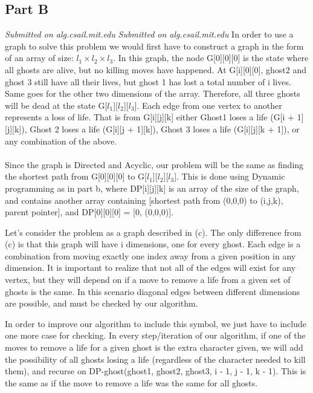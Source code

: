 \documentclass[12pt,twoside]{article}
\begin{document}
\begin{problems}
\section*{Part B}

\problem
\begin{problemparts}
\problempart \emph{Submitted on alg.csail.mit.edu}
\problempart \emph{Submitted on alg.csail.mit.edu}
\problempart In order to use a graph to solve this problem we would first have to construct a graph in the form of an array of size: $l_1 \times l_2 \times l_3$. In this graph, the node G[0][0][0] is the state where all ghosts are alive, but no killing moves have happened. At G[i][0][0], ghost2 and ghost 3 still have all their lives, but ghost 1 has lost a total number of i lives. Same goes for the other two dimensions of the array. Therefore, all three ghosts will be dead at the state G[$l_1$][$l_2$][$l_3$]. Each edge from one vertex to another represents a loss of life. That is from G[i][j][k] either Ghost1  loses a life (G[i + 1][j][k]), Ghost 2 loses a life (G[i][j + 1][k]), Ghost 3 loses a life (G[i][j][k + 1]), or any combination of the above. 
\\\\
Since the graph is Directed and Acyclic, our problem will be the same as finding the shortest path from G[0][0][0] to G[$l_1$][$l_2$][$l_3$]. This is done using Dynamic programming as in part b, where DP[i][j][k] is an array of the size of the graph, and contains another array containing [shortest path from (0,0,0) to (i,j,k), parent pointer], and DP[0][0][0] = [0, (0,0,0)]. 

\problempart Let's consider the problem as a graph described in (c). The only difference from (c) is that this graph will have i dimensions, one for every ghost. Each edge is a combination from moving exactly one index away from a given position in any dimension. It is important to realize that not all of the edges will exist for any vertex, but they will depend on if a move to remove a life from a given set of ghosts is the same. In this scenario diagonal edges between different dimensions are possible, and must be checked by our algorithm.

\problempart In order to improve our algorithm to include this symbol, we just have to include one more case for checking. In every step/iteration of our algorithm, if one of the moves to remove a life for a given ghost is the extra character given, we will add the possibility of all ghosts losing a life (regardless of the character needed to kill them), and recurse on DP-ghost(ghost1, ghost2, ghost3, i - 1, j - 1, k - 1). This is the same as if the move to remove a life was the same for all ghosts. 

\end{problemparts}

\end{problems}
\end{document}
